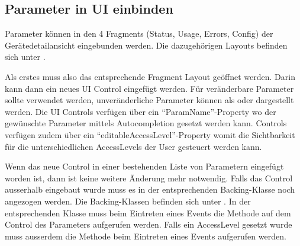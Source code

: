 \subsection{Parameter in UI einbinden}
\label{sub:parameter_einbinden}
Parameter können in den 4 Fragments (Status, Usage, Errors, Config) der Gerätedetailansicht eingebunden werden. Die dazugehörigen Layouts befinden sich unter .

Als erstes muss also das entsprechende Fragment Layout geöffnet werden. Darin kann dann ein neues UI Control eingefügt werden. Für veränderbare Parameter sollte  verwendet werden, unveränderliche Parameter können als  oder  dargestellt werden. Die UI Controls verfügen über ein \enquote{ParamName}-Property wo der gewünschte Parameter mittels Autocompletion gesetzt werden kann.  Controls verfügen zudem über ein \enquote{editableAccessLevel}-Property womit die Sichtbarkeit für die unterschiedlichen AccessLevels der User gesteuert werden kann.

Wenn das neue Control in einer bestehenden Liste von Parametern eingefügt worden ist, dann ist keine weitere Änderung mehr notwendig. Falls das Control ausserhalb eingebaut wurde muss es in der entsprechenden Backing-Klasse noch angezogen werden. Die Backing-Klassen befinden sich unter . In der entsprechenden Klasse muss beim Eintreten eines  Events die Methode  auf dem Control des Parameters aufgerufen werden. Falls ein AccessLevel gesetzt wurde muss ausserdem die Methode  beim Eintreten eines  Events aufgerufen werden.